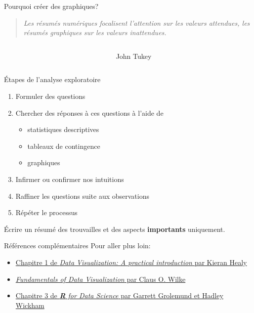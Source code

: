 \documentclass[
  ignorenonframetext,
]{beamer}
\providecommand{\tightlist}{%
  \setlength{\itemsep}{0pt}\setlength{\parskip}{0pt}}\usepackage{longtable,booktabs,array}
\begin{document}
\begin{frame}{Pourquoi créer des graphiques?}
\protect\hypertarget{pourquoi-cruxe9er-des-graphiques}{}
\begin{quote}
\emph{Les résumés numériques focalisent l'attention sur les valeurs
attendues, les résumés graphiques sur les valeurs inattendues.}
\end{quote}

\begin{columns}[T]
\begin{column}{0.8\textwidth}
\end{column}

\begin{column}{0.2\textwidth}
John Tukey
\end{column}
\end{columns}
\end{frame}

\begin{frame}{Étapes de l'analyse exploratoire}
\protect\hypertarget{uxe9tapes-de-lanalyse-exploratoire}{}
\begin{enumerate}
\tightlist
\item
  Formuler des questions
\item
  Chercher des réponses à ces questions à l'aide de

  \begin{itemize}
  \tightlist
  \item
    statistiques descriptives
  \item
    tableaux de contingence
  \item
    graphiques
  \end{itemize}
\item
  Infirmer ou confirmer nos intuitions
\item
  Raffiner les questions suite aux observations
\item
  Répéter le processus
\end{enumerate}

Écrire un résumé des trouvailles et des aspects \textbf{importants}
uniquement.
\end{frame}

\begin{frame}{Références complémentaires}
\protect\hypertarget{ruxe9fuxe9rences-compluxe9mentaires}{}
Pour aller plus loin:

\begin{itemize}
\tightlist
\item
  \href{https://socviz.co/lookatdata.html\#lookatdata}{Chapitre 1 de
  \emph{Data Visualization: A practical introduction} par Kieran Healy}
\item
  \href{https://serialmentor.com/dataviz/}{\emph{Fundamentals of Data
  Visualization} par Claus O. Wilke}
\item
  \href{https://r4ds.had.co.nz/}{Chapitre 3 de \emph{\textbf{R} for Data
  Science} par Garrett Grolemund et Hadley Wickham}
\end{itemize}
\end{frame}
\end{document}
